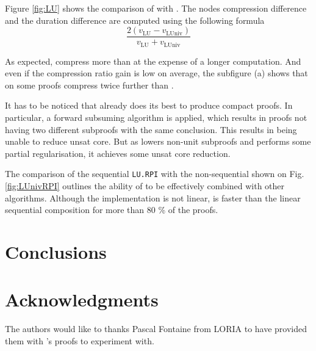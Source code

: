 \documentclass{llncs}
\begin{document}
Figure \ref{fig:LU} shows the comparison of {\LowerUnits} with {\LowerUnivalents}. The nodes
compression difference and the duration difference are computed using the following formula
$$ \frac {2(v_{\text{LU}} - v_{\text{LUniv}})}
         {  v_{\text{LU}} + v_{\text{LUniv}} } $$



As expected, {\LowerUnivalents} compress more than {\LowerUnits} at the expense of a longer
computation. And even if the compression ratio gain is low on average, the subfigure (a) shows that
on some proofs {\LowerUnivalents} compress twice further than {\LowerUnits}.

It has to be noticed that \veriT already does its best to produce compact proofs. In particular,
a forward subsuming algorithm is applied, which results in proofs not having two different subproofs
with the same conclusion. This results in {\LowerUnits} being unable to reduce unsat core.
But as {\LowerUnivalents} lowers non-unit subproofs and performs some partial regularisation, it
achieves some unsat core reduction.

The comparison of the sequential \texttt{LU.RPI} with the non-sequential {\LUnivRPI} shown on Fig.
\ref{fig:LUnivRPI} outlines the ability of {\LowerUnivalents} to be effectively combined with other
algorithms. Although the implementation is not linear, {\LUnivRPI} is faster than the linear
sequential composition for more than 80 \% of the proofs.










\FloatBarrier
\section{Conclusions}

\section*{Acknowledgments}

The authors would like to thanks Pascal Fontaine from LORIA to have provided them with {\veriT}'s
proofs to experiment with.



\end{document}
